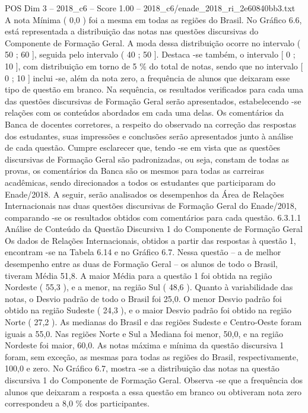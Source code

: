 \begin{textsample}{POS Dim 3 – 2018\_c6 – Score 1.00 – 2018\_c6/enade\_2018\_ri\_2e60840bb3.txt}
A nota Mínima ( 0,0 ) foi a mesma em todas as regiões do Brasil.
No Gráfico 6.6, está representada a distribuição das notas nas questões discursivas do Componente de Formação Geral.
A moda dessa distribuição ocorre no intervalo ( 50 ; 60 ], seguida pelo intervalo ( 40 ; 50 ].
Destaca -se também, o intervalo [ 0 ; 10 ], com distribuição em torno de 5 \% do total de notas, sendo que no intervalo [ 0 ; 10 ] inclui -se, além da nota zero, a frequência de alunos que deixaram esse tipo de questão em branco.
Na sequência, os resultados verificados para cada uma das questões discursivas de Formação Geral serão apresentados, estabelecendo -se relações com os conteúdos abordados em cada uma delas.
Os comentários da Banca de docentes corretores, a respeito do observado na correção das respostas dos estudantes, suas impressões e conclusões serão apresentados junto à análise de cada questão.
Cumpre esclarecer que, tendo -se em vista que as questões discursivas de Formação Geral são padronizadas, ou seja, constam de todas as provas, os comentários da Banca são os mesmos para todas as carreiras acadêmicas, sendo direcionados a todos os estudantes que participaram do Enade/2018.
A seguir, serão analisados os desempenhos da Área de Relações Internacionais nas duas questões discursivas de Formação Geral do Enade/2018, comparando -se os resultados obtidos com comentários para cada questão. 6.3.1.1 Análise de Conteúdo da Questão Discursiva 1 do Componente de Formação Geral Os dados de Relações Internacionais, obtidos a partir das respostas à questão 1, encontram -se na Tabela 6.14 e no Gráfico 6.7.
Nessa questão – a de melhor desempenho entre as duas de Formação Geral – os alunos de todo o Brasil, tiveram Média 51,8.
A maior Média para a questão 1 foi obtida na região Nordeste ( 55,3 ), e a menor, na região Sul ( 48,6 ).
Quanto à variabilidade das notas, o Desvio padrão de todo o Brasil foi 25,0.
O menor Desvio padrão foi obtido na região Sudeste ( 24,3 ), e o maior Desvio padrão foi obtido na região Norte ( 27,2 ).
As medianas do Brasil e das regiões Sudeste e Centro-Oeste foram iguais a 55,0.
Nas regiões Norte e Sul a Mediana foi menor, 50,0, e na região Nordeste foi maior, 60,0.
As notas máxima e mínima da questão discursiva 1 foram, sem exceção, as mesmas para todas as regiões do Brasil, respectivamente, 100,0 e zero.
No Gráfico 6.7, mostra -se a distribuição das notas na questão discursiva 1 do Componente de Formação Geral.
Observa -se que a frequência dos alunos que deixaram a resposta a essa questão em branco ou obtiveram nota zero correspondeu a 8,0 \% dos participantes.

\end{textsample}
